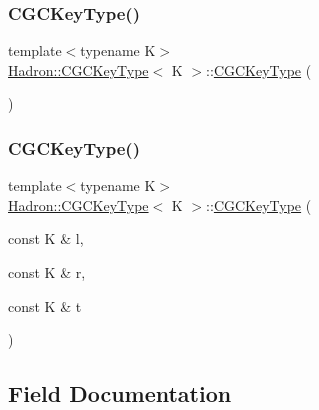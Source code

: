 \subsubsection{\texorpdfstring{CGCKeyType()}{CGCKeyType()}\hspace{0.1cm}{\footnotesize\ttfamily [5/6]}}
{\footnotesize\ttfamily template$<$typename K$>$ \\
\mbox{\hyperlink{structHadron_1_1CGCKeyType}{Hadron\+::\+C\+G\+C\+Key\+Type}}$<$ K $>$\+::\mbox{\hyperlink{structHadron_1_1CGCKeyType}{C\+G\+C\+Key\+Type}} (\begin{DoxyParamCaption}{ }\end{DoxyParamCaption})\hspace{0.3cm}{\ttfamily [inline]}}

\mbox{\label{structHadron_1_1CGCKeyType_a0547a9be19cf1cc084477d2eb8ee5d98}} 
\subsubsection{\texorpdfstring{CGCKeyType()}{CGCKeyType()}\hspace{0.1cm}{\footnotesize\ttfamily [6/6]}}
{\footnotesize\ttfamily template$<$typename K$>$ \\
\mbox{\hyperlink{structHadron_1_1CGCKeyType}{Hadron\+::\+C\+G\+C\+Key\+Type}}$<$ K $>$\+::\mbox{\hyperlink{structHadron_1_1CGCKeyType}{C\+G\+C\+Key\+Type}} (\begin{DoxyParamCaption}\item[{const K \&}]{l,  }\item[{const K \&}]{r,  }\item[{const K \&}]{t }\end{DoxyParamCaption})\hspace{0.3cm}{\ttfamily [inline]}}



\subsection{Field Documentation}
\mbox{\label{structHadron_1_1CGCKeyType_a3b226cbdc5e984aebb5bffbab67bf3d3}} 
